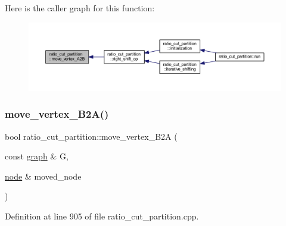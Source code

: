 Here is the caller graph for this function\+:\nopagebreak
\begin{figure}[H]
\begin{center}
\leavevmode
\includegraphics[width=350pt]{classratio__cut__partition_a8988d72cd456e79243f0e1c1b03ed501_icgraph}
\end{center}
\end{figure}
\mbox{\label{classratio__cut__partition_ab192d7130a80b6acf7da704162c51e6c}} 
\subsubsection{\texorpdfstring{move\+\_\+vertex\+\_\+\+B2\+A()}{move\_vertex\_B2A()}}
{\footnotesize\ttfamily bool ratio\+\_\+cut\+\_\+partition\+::move\+\_\+vertex\+\_\+\+B2A (\begin{DoxyParamCaption}\item[{const \mbox{\hyperlink{classgraph}{graph}} \&}]{G,  }\item[{\mbox{\hyperlink{classnode}{node}} \&}]{moved\+\_\+node }\end{DoxyParamCaption})\hspace{0.3cm}{\ttfamily [protected]}}



Definition at line 905 of file ratio\+\_\+cut\+\_\+partition.\+cpp.


